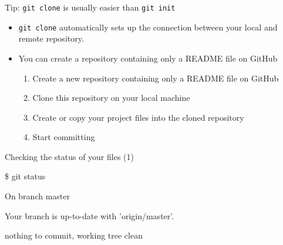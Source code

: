 \documentclass[handout]{beamer}
\begin{document}
\begin{frame}{Tip: \texttt{git clone} is usually easier than \texttt{git init}}
	\begin{itemize}
		\item \texttt{git clone} automatically sets up the connection between your local and remote repository. 
		\item You can create a repository containing only a README file on GitHub
		\begin{enumerate}
			\item Create a new repository containing only a README file on GitHub
			\item Clone this repository on your local machine
			\item Create or copy your project files into the cloned repository
			\item Start committing
		\end{enumerate}
	\end{itemize}
\end{frame}

\begin{frame}{Checking the status of your files (1)}
	\begin{exampleblock}{}
		\begin{semiverbatim}
			\item \$ git status
		\end{semiverbatim}
	\end{exampleblock}
	\begin{exampleblock}{}
		\begin{semiverbatim}
			\item On branch master
			\item Your branch is up-to-date with 'origin/master'.
			\item nothing to commit, working tree clean
		\end{semiverbatim}
	\end{exampleblock}
\end{frame}
\end{document}
